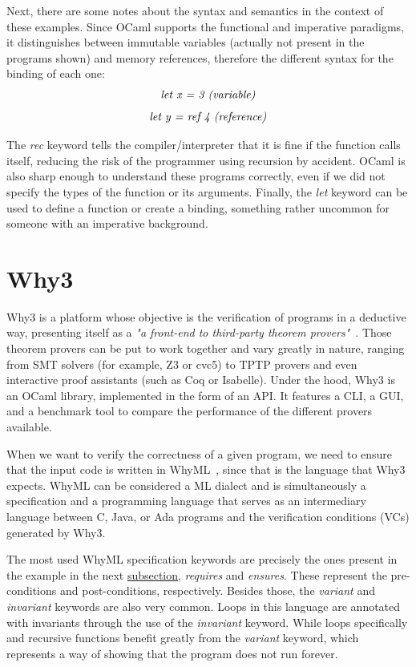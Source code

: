 Next, there are some notes about the syntax and semantics in the context of these examples. 
Since OCaml supports the functional and imperative paradigms, it distinguishes between immutable variables (actually not present in the programs shown) and memory references, therefore the different syntax for the binding of each one: 
\[ \emph{let x = 3 (variable)} \]
\vspace{-25pt}
\[ \emph{let y = ref 4 (reference)} \]

The \emph{rec} keyword tells the compiler/interpreter that it is fine if the function calls itself, reducing the risk of the programmer using recursion by accident.
OCaml is also sharp enough to understand these programs correctly, even if we did not specify the types of the function or its arguments.
Finally, the \emph{let} keyword can be used to define a function or create a binding, something rather uncommon for someone with an imperative background.


\section{Why3}
\label{sec:why3}

Why3 is a platform whose objective is the verification of programs in a deductive way, presenting itself as a \emph{"a front-end to third-party theorem provers"}~\cite{why3}.
Those theorem provers can be put to work together and vary greatly in nature, ranging from SMT solvers (for example, Z3 or cvc5) to TPTP provers and even interactive proof assistants (such as Coq or Isabelle).
Under the hood, Why3 is an OCaml library, implemented in the form of an API.
It features a CLI, a GUI, and a benchmark tool to compare the performance of the different provers available.

When we want to verify the correctness of a given program, we need to ensure that the input code is written in WhyML~\cite{DBLP:conf/esop/FilliatreP13}, since that is the language that Why3 expects.
WhyML can be considered a ML dialect and is simultaneously a specification and a programming language that serves as an intermediary language between C, Java, or Ada programs and the verification conditions (VCs) generated by Why3.

The most used WhyML specification keywords are precisely the ones present in the example in the next \hyperref[subsec:why3_example]{subsection}, \emph{requires} and \emph{ensures}.
These represent the pre-conditions and post-conditions, respectively.
Besides those, the \emph{variant} and \emph{invariant} keywords are also very common.
Loops in this language are annotated with invariants through the use of the \emph{invariant} keyword.
While loops specifically and recursive functions benefit greatly from the \emph{variant} keyword, which represents a way of showing that the program does not run forever.

